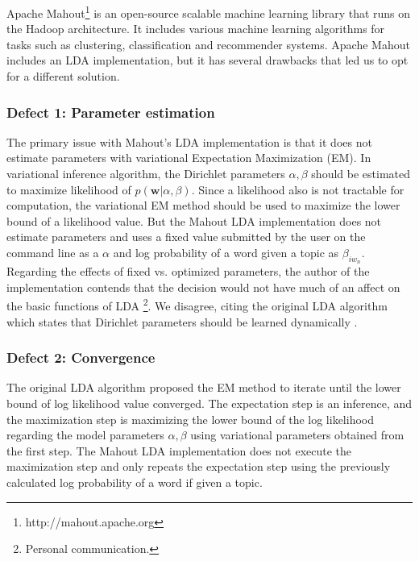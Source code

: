 \documentclass{sig-alternate}
\begin{document}
Apache Mahout\footnote{http://mahout.apache.org} is an open-source scalable machine learning library that runs on the Hadoop architecture. It includes various machine learning algorithms for tasks such as clustering, classification and recommender systems. Apache Mahout includes an LDA implementation, but it has several drawbacks that led us to opt for a different solution.

\subsubsection{Defect 1: Parameter estimation}
The primary issue with Mahout's LDA implementation is that it does not estimate parameters with variational Expectation Maximization (EM). In variational inference algorithm, the Dirichlet parameters $\alpha, \beta$ should be estimated to maximize likelihood of $p(\mathbf{w}|\alpha,\beta)$. Since a likelihood also is not tractable for computation, the variational EM method should be used to maximize the lower bound of a likelihood value. But the Mahout LDA implementation does not estimate parameters and uses a fixed value submitted by the user on the command line as a $\alpha$ and log probability of a word given a topic as $\beta_{iw_n}$. Regarding the effects of fixed vs. optimized parameters, the author of the implementation contends that the decision would not have much of an affect on the basic functions of LDA \footnote{Personal communication.}. We disagree, citing the original LDA algorithm which states that Dirichlet parameters should be learned dynamically \cite{Blei2003a}.

\subsubsection{Defect 2: Convergence}
The original LDA algorithm proposed the EM method to iterate until the lower bound of log likelihood value converged. The expectation step is an inference, and the maximization step is maximizing the lower bound of the log likelihood regarding the model parameters $\alpha, \beta$ using variational parameters obtained from the first step. The Mahout LDA implementation does not execute the maximization step and only repeats the expectation step using the previously calculated log probability of a word if given a topic.
\end{document}
